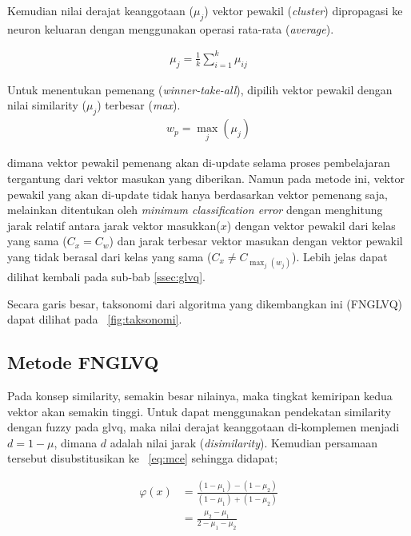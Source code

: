 Kemudian nilai derajat keanggotaan ($\mu_{j}$) vektor pewakil
(\emph{cluster}) dipropagasi ke neuron keluaran dengan menggunakan operasi
rata-rata (\emph{average}).

\begin{align}
	\mu_j = \frac{1}{k} \sum_{i=1}^k \mu_{ij} 
\end{align}

Untuk menentukan pemenang (\emph{winner-take-all}), dipilih vektor
pewakil dengan nilai similarity ($\mu_j$) terbesar (\emph{max}).  
\begin{align}
	w_p = \max_j ( \mu_j )
\end{align}

dimana vektor pewakil pemenang akan di-update selama proses pembelajaran 
tergantung dari vektor masukan yang diberikan. Namun pada metode ini, vektor
pewakil yang akan di-update tidak hanya berdasarkan vektor pemenang saja,
melainkan ditentukan oleh \emph{minimum classification error} dengan menghitung
jarak relatif antara jarak vektor masukkan($x$) dengan vektor pewakil dari
kelas yang sama ($C_x = C_w$) dan jarak terbesar vektor masukan dengan vektor
pewakil yang tidak berasal dari kelas yang sama ($C_x \neq C_{\max_{j}(w_j)}$).
Lebih jelas dapat dilihat kembali pada sub-bab \ref{ssec:glvq}.

Secara garis besar, taksonomi dari algoritma yang dikembangkan ini (FNGLVQ)
dapat dilihat pada \pic~\ref{fig:taksonomi}.
 

\subsection{Metode FNGLVQ}
\label{ssec:metode-fnglvq}
Pada konsep similarity, semakin besar nilainya, maka tingkat kemiripan kedua
vektor akan semakin tinggi. Untuk dapat menggunakan pendekatan similarity dengan
fuzzy pada \gls{glvq},  maka nilai derajat keanggotaan di-komplemen menjadi $d =
1 - \mu$, dimana $d$ adalah nilai jarak (\emph{disimilarity}). Kemudian persamaan
tersebut disubstitusikan ke \equ~\ref{eq:mce} sehingga didapat;

\begin{align}
\label{eq:mcesim}
	\varphi(x) &= \frac{(1 - \mu_1) - (1 - \mu_2)}{(1 - \mu_1) + (1 -
	\mu_2)}\nonumber\\
	&= \frac{\mu_2 - \mu_1}{2 - \mu_1 - \mu_2}
\end{align}

